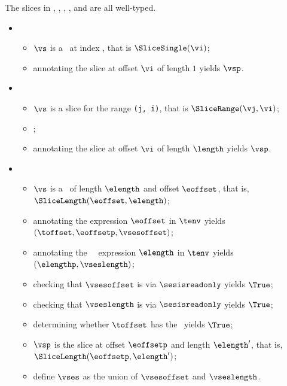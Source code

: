 The slices in
,
,
,
, and
are all well-typed.

\ProseParagraph
\OneApplies
\begin{itemize}
  \item {}
  \begin{itemize}
    \item $\vs$ is a \singleslice\ at index \vi, that is $\SliceSingle(\vi)$;
    \item annotating the slice at offset $\vi$ of length $1$ yields $\vsp$\ProseOrTypeError.
  \end{itemize}

  \item {}
  \begin{itemize}
    \item $\vs$ is a slice for the range \texttt{(j, i)}, that is $\SliceRange(\vj, \vi)$;
    \item {};
    \item annotating the slice at offset $\vi$ of length $\length$ yields $\vsp$\ProseOrTypeError.
  \end{itemize}

  \item {}
  \begin{itemize}
    \item $\vs$ is a \lengthslice\ of length $\elength$ and offset $\eoffset$, that is, \\
          $\SliceLength(\eoffset, \elength)$;
    \item annotating the expression $\eoffset$ in $\tenv$ yields \\
          $(\toffset, \eoffsetp, \vsesoffset)$\ProseOrTypeError;
    \item annotating the \symbolicallyevaluableterm\ \constrainedintegerterm\ expression $\elength$ in $\tenv$ yields
    $(\elengthp, \vseslength)$\ProseOrTypeError;
    \item checking that $\vsesoffset$ is \readonlyterm{} via $\sesisreadonly$ yields $\True$\ProseOrTypeError;
    \item checking that $\vseslength$ is \readonlyterm{} via $\sesisreadonly$ yields $\True$\ProseOrTypeError;
    \item determining whether $\toffset$ has the \structureofinteger\ yields $\True$\ProseOrTypeError;
    \item $\vsp$ is the slice at offset $\eoffsetp$ and length $\elength'$, that is,\\
     $\SliceLength(\eoffsetp, \elength')$;
     \item define $\vses$ as the union of $\vsesoffset$ and $\vseslength$.
  \end{itemize}


\end{itemize}
